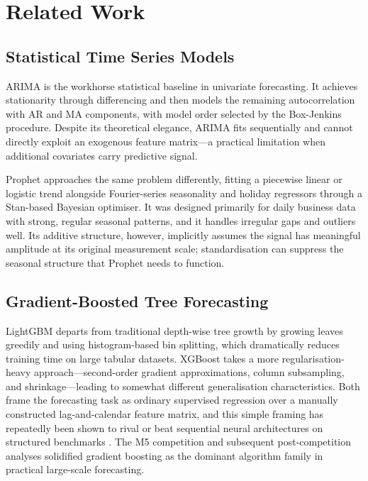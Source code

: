 \documentclass[conference]{IEEEtran}
\begin{document}
  \section{Related Work}

  \subsection{Statistical Time Series Models}

  ARIMA \cite{box2015time} is the workhorse statistical baseline in univariate
  forecasting. It achieves stationarity through differencing and then models the
  remaining autocorrelation with AR and MA components, with model order selected by
  the Box-Jenkins procedure. Despite its theoretical elegance, ARIMA fits sequentially
  and cannot directly exploit an exogenous feature matrix---a practical limitation
  when additional covariates carry predictive signal.

  Prophet \cite{taylor2018prophet} approaches the same problem differently, fitting a
  piecewise linear or logistic trend alongside Fourier-series seasonality and holiday
  regressors through a Stan-based \cite{stan2017} Bayesian optimiser. It was designed
  primarily for daily business data with strong, regular seasonal patterns, and it
  handles irregular gaps and outliers well. Its additive structure, however, implicitly
  assumes the signal has meaningful amplitude at its original measurement scale;
  standardisation can suppress the seasonal structure that Prophet needs to function.

  \subsection{Gradient-Boosted Tree Forecasting}

  LightGBM \cite{ke2017lightgbm} departs from traditional depth-wise tree growth by
  growing leaves greedily and using histogram-based bin splitting, which dramatically
  reduces training time on large tabular datasets. XGBoost \cite{chen2016xgboost}
  takes a more regularisation-heavy approach---second-order gradient approximations,
  column subsampling, and shrinkage---leading to somewhat different generalisation
  characteristics. Both frame the forecasting task as ordinary supervised regression
  over a manually constructed lag-and-calendar feature matrix, and this simple framing
  has repeatedly been shown to rival or beat sequential neural architectures on
  structured benchmarks \cite{hewamalage2021recurrent}. The M5 competition
  \cite{makridakis2022m5} and subsequent post-competition analyses
  \cite{januschowski2022forecasting, lainder2022forecasting} solidified gradient
  boosting as the dominant algorithm family in practical large-scale forecasting.
\end{document}
